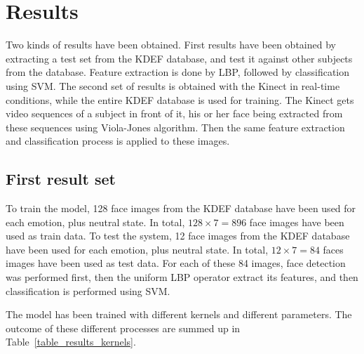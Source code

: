 \chapter{Results}
\label{chap:eval_results}

\noindent Two kinds of results have been obtained. First results have been obtained by extracting a test set from the KDEF database, and test it against other subjects from the database. Feature extraction is done by LBP, followed by classification using SVM. The second set of results is obtained with the Kinect in real-time conditions, while the entire KDEF database is used for training. The Kinect gets video sequences of a subject in front of it, his or her face being extracted from these sequences using Viola-Jones algorithm. Then the same feature extraction and classification process is applied to these images.

\section{First result set}

\vspace{\baselineskip}
\noindent To train the model, 128 face images from the KDEF database have been used for each emotion, plus neutral state. In total, $ 128\times7 = 896 $ face images have been used as train data. To test the system, 12 face images from the KDEF database have been used for each emotion, plus neutral state. In total, $ 12\times7 = 84 $ faces images have been used as test data. For each of these 84 images, face detection was performed first, then the uniform LBP operator extract its features, and then classification is performed using SVM.
\newline

\noindent The model has been trained with different kernels and different parameters. The outcome of these different processes are summed up in Table~\ref{table_results_kernels}.
\newline

